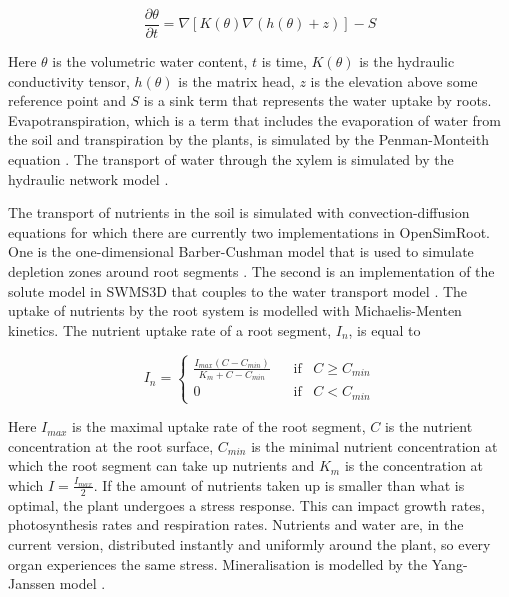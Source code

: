 \documentclass{article}
\begin{document}
$$ \frac{\partial \theta}{\partial t} = \nabla \left[ K(\theta)\nabla ( h(\theta) + z) \right] - S $$

\noindent Here $\theta$ is the volumetric water content, $t$ is time, $K(\theta)$ is the hydraulic conductivity tensor, $h(\theta)$ is the matrix head, $z$ is the elevation above some reference point and $S$ is a sink term that represents the water uptake by roots. Evapotranspiration, which is a term that includes the evaporation of water from the soil and transpiration by the plants, is simulated by the Penman-Monteith equation \cite{Allen1998, Monteith1965, Monteith1981, Penman1948}. The transport of water through the xylem is simulated by the hydraulic network model \cite{Alm1992, Doussan1998}. \newline

\noindent The transport of nutrients in the soil is simulated with convection-diffusion equations for which there are currently two implementations in OpenSimRoot. One is the one-dimensional Barber-Cushman model that is used to simulate depletion zones around root segments \cite{Itoh1983}. The second is an implementation of the solute model in SWMS3D that couples to the water transport model \cite{Simunek1995}. The uptake of nutrients by the root system is modelled with Michaelis-Menten kinetics. The nutrient uptake rate of a root segment, $I_n$, is equal to

$$ I_n = \begin{cases} \frac{I_{max}(C-C_{min})}{K_m + C - C_{min}} & \hspace{10pt} \text{if} \hspace{10pt} C \geq C_{min} \\ 0 & \hspace{10pt} \text{if} \hspace{10pt} C< C_{min} \end{cases} $$

\noindent Here $I_{max}$ is the maximal uptake rate of the root segment, $C$ is the nutrient concentration at the root surface, $C_{min}$ is the minimal nutrient concentration at which the root segment can take up nutrients and $K_m$ is the concentration at which $I = \frac{I_{max}}{2}$. If the amount of nutrients taken up is smaller than what is optimal, the plant undergoes a stress response. This can impact growth rates, photosynthesis rates and respiration rates. Nutrients and water are, in the current version, distributed instantly and uniformly around the plant, so every organ experiences the same stress. Mineralisation is modelled by the Yang-Janssen model \cite{Yang2000}. \newline
\end{document}

